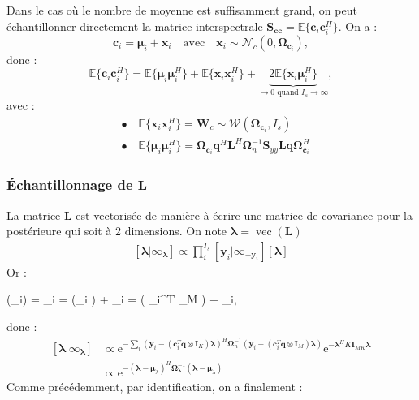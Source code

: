 \documentclass[ 12pt]{article}
\renewenvironment{equation}{\vspace{-0.2cm}\begin{oldequation}}{\vspace{-0.2cm}\end{oldequation}}
\newcommand{\e}{\mathrm{e}}
\begin{document}
Dans le cas où le nombre de moyenne est suffisamment grand, on peut échantillonner directement la matrice interspectrale \hbox{$\bm{S_{cc}} =  \mathbb{E}\{\bm{c}_i\bm{c}_i^H\}$}. On a : 
\begin{equation*}
	    \bm{c}_i = \bm{\mu}_i + \bm{x}_i \quad\text{avec}\quad \bm{x}_i \sim \mathcal{N}_c(0, \bm{\Omega}_{\bm{c}_i}),
\end{equation*}
donc : 
\begin{equation*}
        \mathbb{E}\{\bm{c}_i\bm{c}_i^H\} =  \mathbb{E}\{\bm{\mu}_i \bm{\mu}_i^H\} + \mathbb{E}\{\bm{x}_i \bm{x}_i^H\} + \underbrace{ 2\mathbb{E}\{\bm{x}_i \bm{\mu}_i^H\}}_{\rightarrow 0 \text{ quand } I_{s}\rightarrow \infty},
\end{equation*}
avec : 
\begin{align*}
& \bullet \quad\mathbb{E}\{\bm{x}_i \bm{x}_i^H\} = \bm{W}_c \sim \mathcal{W}(\bm{\Omega}_{\bm{c}_i} , I_{s})\\
& \bullet \quad  \mathbb{E}\{\bm{\mu}_i \bm{\mu}_i^H\}  =  \bm{\Omega}_{\bm{c}_i} \bm{q}^H\bm{L}^H  \bm{\Omega}_n^{-1}\bm{S}_{yy} \bm{Lq}  \bm{\Omega}_{\bm{c}_i}^H
\end{align*}

 

\subsubsection[]{Échantillonnage de $\bm{L}$}
La matrice $\bm{L}$ est vectorisée de manière à écrire une matrice de covariance pour la postérieure qui soit à 2 dimensions. On note $\bm{\lambda}=\operatorname{vec}(\bm{L})$
\begin{align*}
	\left[ \bm{\lambda}| \infty_{\bm{\lambda}}  \right] \propto \prod_i^{I_{s}} [\bm{y}_i | \infty_{-\bm{y}_i}][\bm{\lambda}]
\end{align*}
Or : 
\begin{equation}
        (_i) = _i = (_i ) + _i  = \left( _i^T  \otimes {}_M \right) \bm{\lambda} + _i,
\end{equation}
donc : 
\begin{align*}
        \left[ \bm{\lambda}| \infty_{\bm{\lambda}}  \right] &\propto \e^{-\sum_i  \left( \bm{y}_i -  \left( \bm{c}_i^T \bm{q} \otimes \bm{I}_K \right) \bm{\lambda} \right) ^H \bm{\Omega}_n^{-1}  \left( \bm{y}_i -  \left( \bm{c}_i^T \bm{q} \otimes \bm{I}_M \right) \bm{\lambda} \right) }
        \e^{- \bm{\lambda}^H K\bm{I}_{MK} \bm{\lambda} }\\
&\propto \e^{ - (\bm{\lambda}- \bm{\mu}_\lambda)^H \bm{\Omega}^{-1}_{\bm{\lambda}}     (\bm{\lambda}- \bm{\mu}_\lambda)  }
\end{align*}
Comme précédemment, par identification, on a finalement : \\
\end{document}
